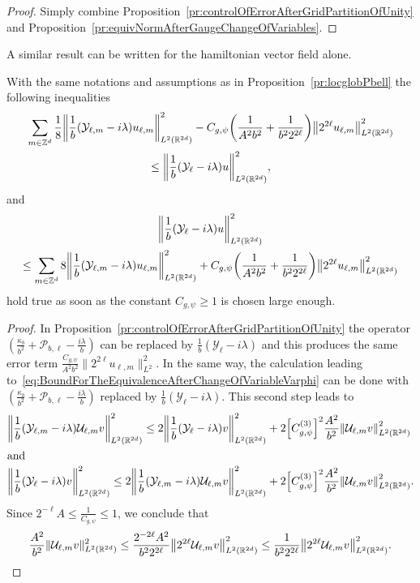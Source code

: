 \documentclass[10pt]{amsart}
\theoremstyle{definition}\newtheorem{defi}[theo]{Definition}\newtheorem{rema}[theo]{Remark}\newtheorem{exam}[theo]{Example}\newtheorem{exem}[theo]{Example}\newtheorem{nota}[theo]{Notation}
\newcommand{\Z}{\mathbb{Z}}
\newcommand{\R}{\mathbb{R}}
\newcommand{\clY}{\mathcal{Y}}
\newcommand{\clP}{\mathcal{P}}
\newcommand{\clU}{\mathcal{U}}
\newcommand\norm[1]{\left\lVert#1\right\rVert}
\let\originalleft\left
\let\originalright\right
\renewcommand{\left}{\mathopen{}\mathclose\bgroup\originalleft}
\renewcommand{\right}{\aftergroup\egroup\originalright}
\newcounter{setofstep}
\newcounter{step}[setofstep]
\begin{document}
\begin{proof}
Simply combine Proposition~\ref{pr:controlOfErrorAfterGridPartitionOfUnity} and Proposition~\ref{pr:equivNormAfterGaugeChangeOfVariables}.
\end{proof}

A similar result can be written for the hamiltonian vector field alone.

\begin{prop}\label{pr:locglobYell}
With the same notations and assumptions as in Proposition~\ref{pr:locglobPbell} the following inequalities
\begin{multline*}
\sum_{m\in \Z^d}\frac{1}{8}\left\| \frac{1}{b}(\clY_{\ell,m} - i\lambda) u_{\ell,m}\right\|^{2}_{L^2(\R^{2d})}-C_{g,\psi}\left(\frac{1}{A^2b^2}+\frac{1}{b^2 2^{2\ell}}\right)\norm{2^{2\ell}u_{\ell,m}}_{L^2(\R^{2d})}^2
\\
\leq
\left\| \frac{1}{b}(\clY_{\ell} - i\lambda) u \right\|^{2}_{L^2(\R^{2d})},
\end{multline*}
and
\begin{multline*}
\left\| \frac{1}{b}(\clY_{\ell} - i\lambda) u \right\|^{2}_{L^2(\R^{2d})}
\\
\leq \sum_{m\in \Z^d} 8\left\| \frac{1}{b}(\clY_{\ell,m} - i\lambda) u_{\ell,m}\right\|^{2}_{L^2(\R^{2d})} +C_{g,\psi}\left(\frac{1}{A^2b^2}+\frac{1}{b^2 2^{2\ell}}\right)\norm{2^{2\ell}u_{\ell,m}}_{L^2(\R^{2d})}^2
\end{multline*}
hold true as soon as the constant $C_{g,\psi}\geq 1$ is chosen large enough.
\end{prop}
\begin{proof}
In Proposition~\ref{pr:controlOfErrorAfterGridPartitionOfUnity} the operator $(\frac{\kappa_{b}}{b^{2}}+\clP_{b,\ell} - \frac{i\lambda}{b})$ can be replaced by $\frac{1}{b}(\clY_{\ell}-i\lambda)$ and this produces the same error term $\frac{C_{g,\psi}}{A^2b^2}\|2^{2\ell}u_{\ell,m}\|_{L^2}^2$. In the same way, the calculation leading to~\eqref{eq:BoundForTheEquivalenceAfterChangeOfVariableVarphi} can be done with $(\frac{\kappa_{b}}{b^{2}}+\clP_{b,\ell} - \frac{i\lambda}{b})$ replaced by $\frac{1}{b}(\clY_{\ell}-i\lambda)$. This second step leads to
\begin{align*}
\left\|\frac{1}{b}(\clY_{\ell,m}-i\lambda)\clU_{\ell,m}v\right\|^2_{L^2(\R^{2d})}\leq 2\left\|\frac{1}{b}(\clY_{\ell}-i\lambda)v\right\|^2_{L^2(\R^{2d})} &+2\left[C_{g,\psi}^{(3)}\right]^2\frac{A^2}{b^2}\left\|\clU_{\ell,m}v\right\|^2_{L^2(\R^{2d})}
\\
\intertext{and}
\left\|\frac{1}{b}(\clY_{\ell}-i\lambda)v\right\|^2_{L^2(\R^{2d})}\leq 2 \left\|\frac{1}{b}(\clY_{\ell,m}-i\lambda)\clU_{\ell,m}v\right\|^2_{L^2(\R^{2d})} &+2\left[C_{g,\psi}^{(3)}\right]^2\frac{A^2}{b^2}\left\|\clU_{\ell,m}v\right\|^2_{L^2(\R^{2d})}.
\end{align*}
Since $2^{-\ell}A\leq \frac{1}{C_{g,\psi}}\leq 1 $, we conclude that
\[
\frac{A^2}{b^2}\|\clU_{\ell,m}v\|^2_{L^2(\R^{2d})}\leq \frac{2^{-2\ell}A^2}{b^2 2^{2\ell}}\left\|2^{2\ell}\clU_{\ell,m}v\right\|^2_{L^2(\R^{2d})}\leq\frac{1}{b^2 2^{2\ell}}\left\|2^{2\ell}\clU_{\ell,m}v\right\|^2_{L^2(\R^{2d})}.\qedhere
\]
\end{proof}
\end{document}

